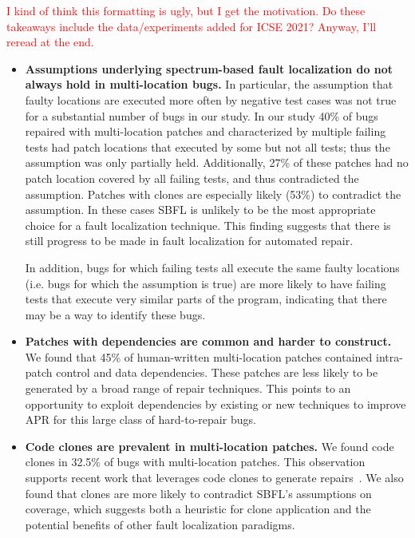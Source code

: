 \documentclass[10pt, conference]{IEEEtran}
\newcommand\todo[1]{\textcolor{red}{#1}}
\begin{document}
\todo{I kind of think this formatting is ugly, but I get the motivation.  Do
  these takeaways include the data/experiments added for ICSE 2021?  Anyway,
  I'll reread at the end.}
\begin{itemize}[wide, labelindent=0pt]
\item \textbf{Assumptions underlying spectrum-based fault
  localization do not always hold in multi-location bugs.}
In particular, the assumption that faulty locations
are executed more often by negative test cases was not true for a substantial
number of bugs in our study. In our study 40\% of bugs repaired with
multi-location patches and characterized by multiple failing tests had patch
locations that executed by some but not all tests; thus the assumption was only 
partially held. Additionally, 27\% of
these patches had no patch location covered by all failing
tests, and thus contradicted the assumption.  
Patches with clones are especially likely (53\%) to contradict the assumption.
In these cases SBFL is unlikely to be the most 
appropriate choice for a
fault localization technique. This finding suggests that there is still progress
to be made in fault localization for automated repair.

In addition, bugs for which failing tests all execute the same faulty locations (i.e. bugs for 
which the assumption is true) are more likely to have failing tests that execute very similar 
parts of the program, indicating that there may be a way to identify these bugs.

\item \textbf{Patches with dependencies are common and harder to construct.}
We found that 45\% of human-written multi-location patches contained
intra-patch control and data dependencies. These patches are less likely to be
generated by a broad range of repair techniques. 
This points to an opportunity to exploit dependencies by
existing or new techniques to improve APR for this large class of hard-to-repair
bugs.

\item\textbf{Code clones are prevalent in multi-location patches.}
We found code clones in 32.5\% of bugs with multi-location
patches. This observation supports recent work that leverages code clones to
generate repairs~\cite{saha2019harnessing}.
We also found that clones are more likely to contradict SBFL's assumptions 
on coverage, which suggests both a heuristic for clone application and the
potential benefits of other fault localization paradigms.


\end{itemize}
\end{document}
